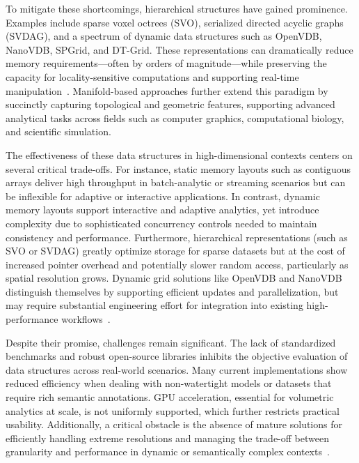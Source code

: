 \documentclass[sigconf]{acmart}
\begin{document}
To mitigate these shortcomings, hierarchical structures have gained prominence. Examples include sparse voxel octrees (SVO), serialized directed acyclic graphs (SVDAG), and a spectrum of dynamic data structures such as OpenVDB, NanoVDB, SPGrid, and DT-Grid. These representations can dramatically reduce memory requirements---often by orders of magnitude---while preserving the capacity for locality-sensitive computations and supporting real-time manipulation~\cite{ref86}. Manifold-based approaches further extend this paradigm by succinctly capturing topological and geometric features, supporting advanced analytical tasks across fields such as computer graphics, computational biology, and scientific simulation.

The effectiveness of these data structures in high-dimensional contexts centers on several critical trade-offs. For instance, static memory layouts such as contiguous arrays deliver high throughput in batch-analytic or streaming scenarios but can be inflexible for adaptive or interactive applications. In contrast, dynamic memory layouts support interactive and adaptive analytics, yet introduce complexity due to sophisticated concurrency controls needed to maintain consistency and performance. Furthermore, hierarchical representations (such as SVO or SVDAG) greatly optimize storage for sparse datasets but at the cost of increased pointer overhead and potentially slower random access, particularly as spatial resolution grows. Dynamic grid solutions like OpenVDB and NanoVDB distinguish themselves by supporting efficient updates and parallelization, but may require substantial engineering effort for integration into existing high-performance workflows~\cite{ref86}. 

Despite their promise, challenges remain significant. The lack of standardized benchmarks and robust open-source libraries inhibits the objective evaluation of data structures across real-world scenarios. Many current implementations show reduced efficiency when dealing with non-watertight models or datasets that require rich semantic annotations. GPU acceleration, essential for volumetric analytics at scale, is not uniformly supported, which further restricts practical usability. Additionally, a critical obstacle is the absence of mature solutions for efficiently handling extreme resolutions and managing the trade-off between granularity and performance in dynamic or semantically complex contexts~\cite{ref86}.
\end{document}
